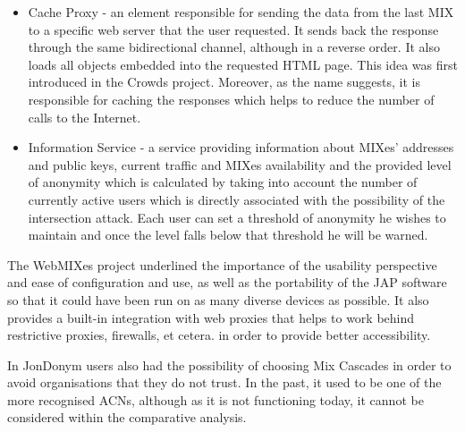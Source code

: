 \begin{itemize}
    \item Cache Proxy - an element responsible for sending the data from the last MIX to a specific web server that the user requested. It sends back the response through the same bidirectional channel, although in a reverse order. It also loads all objects embedded into the requested HTML page. This idea was first introduced in the Crowds project. Moreover, as the name suggests, it is responsible for caching the responses which helps to reduce the number of calls to the Internet.
    \item Information Service - a service providing information about MIXes’ addresses and public keys, current traffic and MIXes availability and the provided level of anonymity which is calculated by taking into account the number of currently active users which is directly associated with the possibility of the intersection attack. Each user can set a threshold of anonymity he wishes to maintain and once the level falls below that threshold he will be warned.
\end{itemize}

The WebMIXes project underlined the importance of the usability perspective and ease of configuration and use, as well as the portability of the JAP software so that it could have been run on as many diverse devices as possible. It also provides a built-in integration with web proxies that helps to work behind restrictive proxies, firewalls, et cetera. in order to provide better accessibility.

In JonDonym users also had the possibility of choosing Mix Cascades in order to avoid organisations that they do not trust. In the past, it used to be one of the more recognised ACNs, although as it is not functioning today, it cannot be considered within the comparative analysis.

